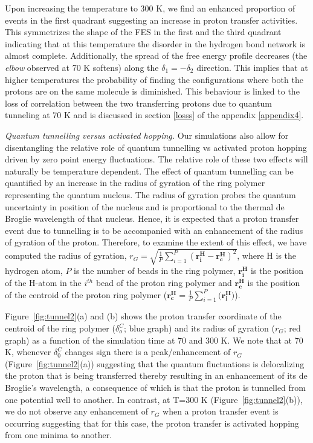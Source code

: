 Upon increasing the temperature to 300 K, we find an enhanced proportion of events in the first quadrant suggesting an increase in proton transfer activities. This symmetrizes the shape of the FES in the first and the third quadrant indicating that at this temperature the disorder in the hydrogen bond network is almost complete. Additionally, the spread of the free energy profile decreases (the \emph{elbow} observed at 70 K softens) along the $\delta_1 = -\delta_2$ direction. This implies that at higher temperatures the probability of finding the configurations where both the protons are on the same molecule is diminished. This behaviour is linked to the loss of correlation between the two transferring protons due to quantum tunneling at 70 K and is discussed in section \ref{losss} of the appendix \ref{appendix4}.
 

\noindent \textit{Quantum tunnelling versus activated hopping.} Our simulations also allow for disentangling the relative role of quantum tunnelling vs activated proton hopping driven by zero point energy fluctuations. The relative role of these two effects will naturally be temperature dependent. The effect of quantum tunnelling can be quantified by an increase in the radius of gyration of the ring polymer representing the quantum nucleus\cite{ceriotti_hbond_fluc}. The radius of gyration probes the quantum uncertainty in position of the nucleus and is proportional to the thermal de Broglie
wavelength of that nucleus. Hence, it is expected that a proton transfer
event due to tunnelling is to be accompanied with an enhancement of the radius of gyration of the proton. Therefore, to examine the extent of this effect, we have computed the radius of gyration, $r_G = 
\sqrt{\frac{1}{P}\sum_{i=1}^{P} (\mathbf{r_i^H}-\mathbf{r_c^H})^2}$,  where H is the hydrogen atom,
$P$ is the number of beads in the ring polymer, $\mathbf{r_i^H}$ is the position of the H-atom in the $i^{th}$ 
bead of the proton ring polymer and $\mathbf{r_c^H}$ is the position of the centroid of the proton ring polymer 
($\mathbf{r_c^H}=\frac{1}{P}\sum_{i=1}^{P} (\mathbf{r_i^H)}$).

Figure~\ref{fig:tunnel2}(a) and (b) shows the proton 
transfer coordinate of the centroid of the ring polymer ($\delta_o^C$; blue graph) and its radius of gyration  ($r_G$; red graph) as a function of the simulation time at 70 and 300 K.
We note that at 70 K, whenever $\delta_0^C$ changes sign there is a peak/enhancement of $r_G$ (Figure~\ref{fig:tunnel2}(a)) suggesting that the quantum fluctuations is
delocalizing the proton that is being transferred thereby resulting in an
enhancement of its de Broglie's wavelength, a consequence of which is that the
proton is tunnelled from one potential well to another. In contrast,
at T=300 K (Figure~\ref{fig:tunnel2}(b)), we do not observe any 
enhancement of $r_G$ when a proton transfer event is occurring suggesting
that for this case, the proton transfer is activated hopping from one minima to another.


